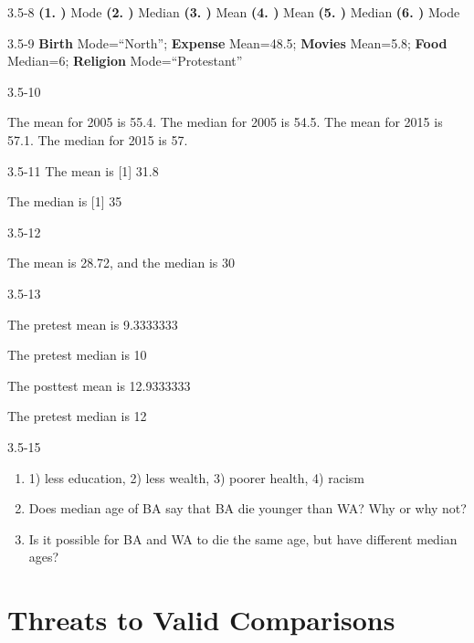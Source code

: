 \begin{exsol@solution}{3.5-8}
  {\bf{(1. )}} Mode  {\bf{(2. )}} Median  {\bf{(3. )}} Mean  {\bf{(4. )}} Mean  {\bf{(5. )}} Median  {\bf{(6. )}} Mode

\end{exsol@solution}
\begin{exsol@solution}{3.5-9}
     {\bf{Birth}} Mode=``North'';   {\bf{Expense}} Mean=48.5; {\bf{Movies}} Mean=5.8; {\bf{Food}} Median=6;  {\bf{Religion}} Mode=``Protestant''

\end{exsol@solution}
\begin{exsol@solution}{3.5-10}

The mean for 2005 is 55.4.
The median for 2005 is 54.5.
The mean for 2015 is 57.1.
The median for 2015 is 57.

\end{exsol@solution}
\begin{exsol@solution}{3.5-11}
	The mean is
[1] 31.8


	The median is
[1] 35


\end{exsol@solution}
\begin{exsol@solution}{3.5-12}


  The mean is 28.72, and the median is 30

\end{exsol@solution}
\begin{exsol@solution}{3.5-13}



	The pretest mean is  9.3333333


	The pretest median is 10


	The posttest mean is	12.9333333


The pretest median is 12

\end{exsol@solution}
\begin{exsol@solution}{3.5-15}
\begin{enumerate}
\item   1) less education, 2) less wealth, 3) poorer health, 4) racism
\item Does median age of BA say that BA die younger than WA? Why or why not?
\item Is it possible for BA and WA to die the same age, but have different median \\ ages?
\end{enumerate}
\end{exsol@solution}
\setcounter{chapter}{3}\chapter{Threats to Valid Comparisons}
